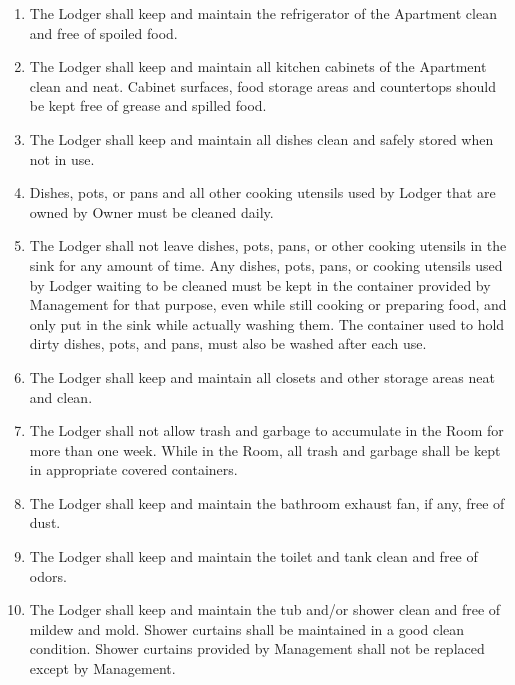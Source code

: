 \documentclass[12pt,letterpaper]{article}
\newcommand{\lodger}{Lodger}
\newcommand{\management}{Management}
\newcommand{\apt}{Apartment}
\newcommand{\room}{Room}
\begin{document}
\begin{enumerate}
	\item The \lodger{} shall keep and maintain the refrigerator of the \apt{} clean and free of spoiled food.
	\item The \lodger{} shall keep and maintain all kitchen cabinets of the \apt{} clean and neat. Cabinet surfaces, food storage areas and countertops should be kept free of grease and spilled food. 
	\item The \lodger{} shall keep and maintain all dishes clean and safely stored when not in use. 
	\item Dishes, pots, or pans and all other cooking utensils used by \lodger{} that are owned by Owner must be cleaned daily.
	\item The \lodger{} shall not leave dishes, pots, pans, or other cooking utensils in the sink for any amount of time. Any dishes, pots, pans, or cooking utensils used by \lodger{} waiting to be cleaned must be kept in the container provided by \management{} for that purpose, even while still cooking or preparing food, and only put in the sink while actually washing them. The container used to hold dirty dishes, pots, and pans, must also be washed after each use.
	\item The \lodger{} shall keep and maintain all closets and other storage areas neat and clean. 
	\item The \lodger{} shall not allow trash and garbage to accumulate in the \room{} for more than one week. While in the \room{}, all trash and garbage shall be kept in appropriate covered containers. 
	\item The \lodger{} shall keep and maintain the bathroom exhaust fan, if any, free of dust. 
	\item The \lodger{} shall keep and maintain the toilet and tank clean and free of odors. 
	\item The \lodger{} shall keep and maintain the tub and/or shower clean and free of mildew and mold. Shower curtains shall be maintained in a good clean condition. Shower curtains provided by \management{} shall not be replaced except by \management{}.
\end{enumerate}
\end{document}
